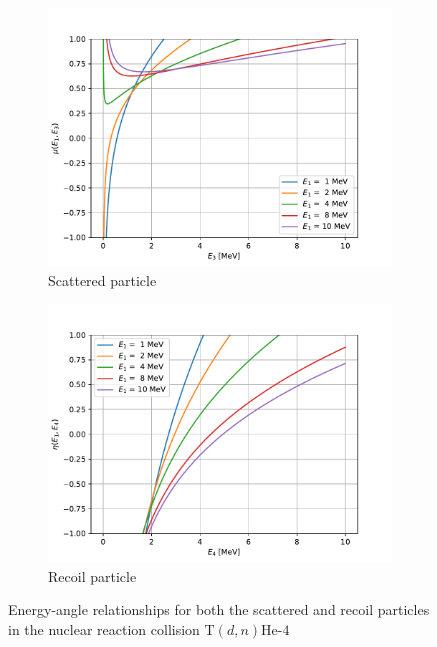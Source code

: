 \begin{figure}[!htb]
  \centering
  \begin{subfigure}{.5\textwidth}
    \centering
    \includegraphics[width=\linewidth]{../figures/particle_kinematics/light_rx_energy_angle.pdf}
    \caption{Scattered particle}
    \label{fig:nuclear-reaction-scattered}
  \end{subfigure}%
  \begin{subfigure}{.5\textwidth}
    \centering
    \includegraphics[width=\linewidth]{../figures/particle_kinematics/light_rx_recoil_energy_angle.pdf}
    \caption{Recoil particle}
    \label{fig:nuclear-reaction-recoil}
  \end{subfigure}
  \caption{Energy-angle relationships for both the scattered and recoil particles in the nuclear reaction collision $\text{T}(d,n)\text{He-4}$}
  \label{fig:nuclear-reaction}
\end{figure}
